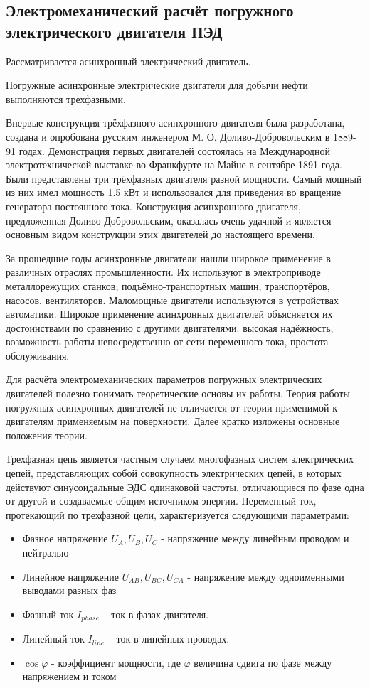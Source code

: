 \subsection{Электромеханический расчёт погружного электрического двигателя ПЭД}
Рассматривается асинхронный электрический двигатель. 

Погружные асинхронные электрические двигатели для добычи нефти выполняются трехфазными. 

Впервые конструкция трёхфазного асинхронного двигателя была разработана, создана и опробована русским инженером М. О. Доливо-Добровольским в 1889-91 годах. Демонстрация первых двигателей состоялась на Международной электротехнической выставке во Франкфурте на Майне в сентябре 1891 года. Были представлены три трёхфазных двигателя разной мощности. Самый мощный из них имел мощность 1.5 кВт и использовался для приведения во вращение генератора постоянного тока. Конструкция асинхронного двигателя, предложенная Доливо-Добровольским, оказалась очень удачной и является основным видом конструкции этих двигателей до настоящего времени.

За прошедшие годы асинхронные двигатели нашли широкое применение в различных отраслях промышленности. Их используют в электроприводе металлорежущих станков, подъёмно-транспортных машин, транспортёров, насосов, вентиляторов. Маломощные двигатели используются в устройствах автоматики. Широкое применение асинхронных двигателей объясняется их достоинствами по сравнению с другими двигателями: высокая надёжность, возможность работы непосредственно от сети переменного тока, простота обслуживания.

Для расчёта электромеханических параметров погружных электрических двигателей полезно понимать теоретические основы их работы. Теория работы погружных асинхронных двигателей не отличается от теории применимой к двигателям применяемым на поверхности. Далее кратко изложены основные положения теории. 

Трехфазная цепь является частным случаем многофазных систем электрических цепей, представляющих собой совокупность электрических цепей, в которых действуют синусоидальные ЭДС одинаковой частоты, отличающиеся по фазе одна от другой и создаваемые общим источником энергии.
Переменный ток, протекающий по трехфазной цели, характеризуется следующими параметрами:

\begin{itemize}
	\item Фазное напряжение $U_A, U_B, U_C $ - напряжение между линейным проводом и нейтралью
	\item Линейное напряжение $U_{AB}, U_{BC}, U_{CA} $ - напряжение между одноименными выводами разных фаз
	\item Фазный ток $I_{phase}$ – ток в фазах двигателя.
	\item Линейный ток $I_{line}$ – ток в линейных проводах.
	\item $ \cos \varphi $ - коэффициент мощности, где $ \varphi$ величина сдвига по фазе между напряжением и током 
\end{itemize}

